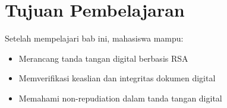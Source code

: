 \section*{Tujuan Pembelajaran}
Setelah mempelajari bab ini, mahasiswa mampu:
\begin{itemize}
\item Merancang tanda tangan digital berbasis RSA
\item Memverifikasi keaslian dan integritas dokumen digital
\item Memahami non-repudiation dalam tanda tangan digital
\end{itemize}
